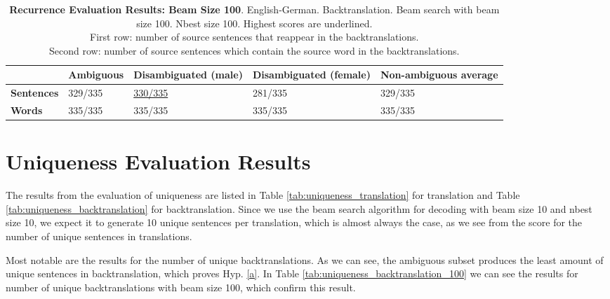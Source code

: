 \begin{table} 
    \label{tab:recurrence_100}
    \begin{tabularx}{\linewidth}{|X|XXXX|}
        \hline
         & \textbf{Ambiguous} & \textbf{Disambiguated (male)} & \textbf{Disambiguated (female)} & \textbf{Non-ambiguous average} \\ \hline
         \textbf{Sentences} & 329/335 & \underline{330/335} & 281/335 & 329/335 \\ 
         \textbf{Words} & 335/335 & 335/335 & 335/335 & 335/335 \\ \hline
    \end{tabularx}
    \caption{\textbf{Recurrence Evaluation Results: Beam Size 100}. English-German. Backtranslation. Beam search with beam size 100. Nbest size 100. Highest scores are underlined. \\ First row: number of source sentences that reappear in the backtranslations. \\ Second row: number of source sentences which contain the source word in the backtranslations.}
\end{table}

\section{Uniqueness Evaluation Results}
\label{ch:Results:Uniqueness}

The results from the evaluation of uniqueness are listed in Table \ref{tab:uniqueness_translation} for translation and Table \ref{tab:uniqueness_backtranslation} for backtranslation.
Since we use the beam search algorithm for decoding with beam size 10 and nbest size 10, we expect it to generate 10 unique sentences per translation, which is almost always the case, as we see from the score for the number of unique sentences in translations. 

Most notable are the results for the number of unique backtranslations. As we can see, the ambiguous subset produces the least amount of unique sentences in backtranslation, which proves Hyp. \ref{a}. In Table \ref{tab:uniqueness_backtranslation_100} we can see the results for number of unique backtranslations with beam size 100, which confirm this result.


